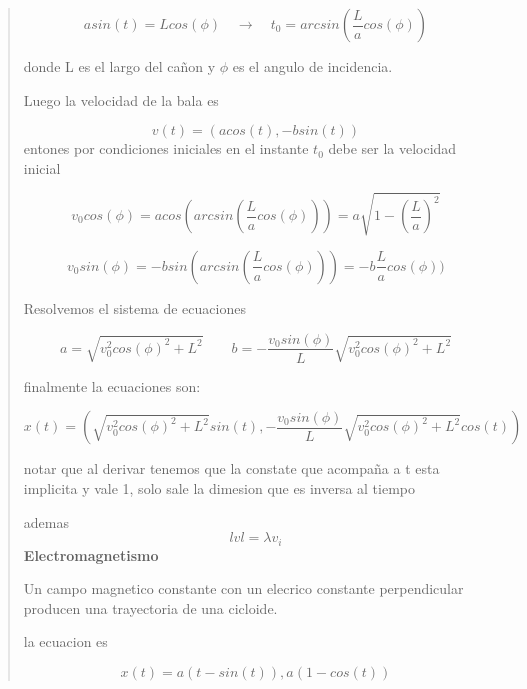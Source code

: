 \documentclass[a4paper, 10pt]{article}
\begin{document}
\begin{quote}
$$ asin(t)= Lcos(\phi) \quad \rightarrow \quad t_0= arcsin( \frac{L}{a}cos(\phi)) $$

donde L es el largo del cañon y $\phi$ es el angulo de incidencia.
 
Luego la velocidad de la bala es

$$ v(t)= (acos(t),-bsin(t)) $$
entones por condiciones iniciales en  el instante $t_0$ debe ser la velocidad inicial

$$  v_0 cos(\phi)= acos( arcsin( \frac{L}{a}cos(\phi)))= a \sqrt{1-  (\frac{L}{a})^2} $$

$$ v_0 sin(\phi) = -bsin( arcsin( \frac{L}{a}cos(\phi)))=-b \frac{L}{a}cos(\phi)) $$

Resolvemos el sistema de ecuaciones

$$ a= \sqrt{v_0^2 cos(\phi)^2 +L^2} \qquad b=- \frac{v_0 sin(\phi)}{L}\sqrt{v_0^2cos(\phi)^2 +L^2} $$

finalmente la ecuaciones son:

$$x(t)= ( \sqrt{v_0^2 cos(\phi)^2 +L^2} sin(t), - \frac{v_0 sin(\phi)}{L}\sqrt{v_0^2cos(\phi)^2 +L^2}cos(t))$$

notar que al derivar tenemos que la constate que acompaña a t esta implicita y vale 1, solo sale la dimesion que es inversa al tiempo

ademas $$ lvl = \lambda v_i $$
\textbf{Electromagnetismo}

Un campo magnetico constante con un elecrico constante perpendicular producen una trayectoria de una cicloide.


la ecuacion es

$$x(t) = a(t-sin(t)), a(1-cos(t)) $$


\end{quote}
\end{document}
